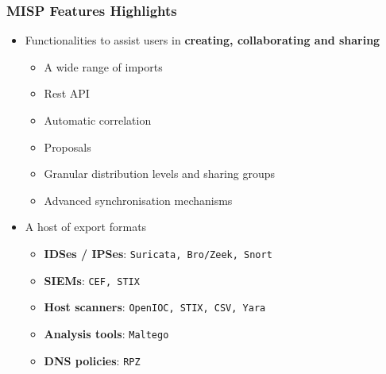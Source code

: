 \begin{frame}
\frametitle{MISP Features Highlights}
    \begin{itemize}
        \item Functionalities to assist users in {\bf creating, collaborating and sharing}
        \begin{itemize}
            \item A wide range of imports
            \item Rest API
            \item Automatic correlation
            \item Proposals
            \item Granular distribution levels and sharing groups
            \item Advanced synchronisation mechanisms
        \end{itemize}
        \item A host of export formats
        \begin{itemize}
            \item {\bf IDSes / IPSes}: \texttt{Suricata, Bro/Zeek, Snort}
            \item {\bf SIEMs}: \texttt{CEF, STIX} 
            \item {\bf Host scanners}:  \texttt{OpenIOC, STIX, CSV, Yara}
            \item {\bf Analysis tools}: \texttt{Maltego}
            \item {\bf DNS policies}: \texttt{RPZ}
        \end{itemize}
    \end{itemize}
\end{frame}

